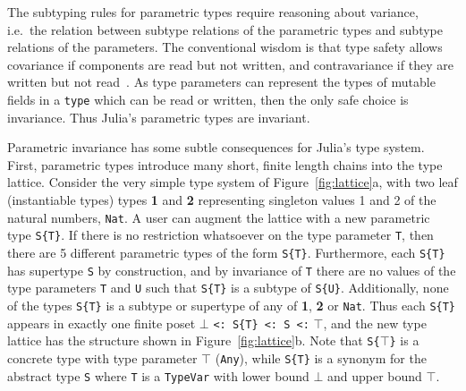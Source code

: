\documentclass[pldi]{sigplanconf-pldi15}
\begin{document}
The subtyping rules for parametric types require reasoning about variance,
i.e.\ the relation between subtype relations of the parametric types and
subtype relations of the parameters. The conventional wisdom is that type
safety allows covariance if components are read but not written, and
contravariance if they are written but not read~\cite{Castagna1995}. As type
parameters can represent the types of mutable fields in a \verb|type| which can
be read or written, then the only safe choice is invariance. Thus Julia's
parametric types are invariant.

Parametric invariance has some subtle consequences for Julia's type system.
First, parametric types introduce many short, finite length chains into the
type lattice. Consider the very simple type system of
Figure~\ref{fig:lattice}a, with two leaf (instantiable types) types \textbf{1}
and \textbf{2} representing singleton values 1 and 2 of the natural numbers,
\verb|Nat|. A user can augment the lattice with a new parametric type
\verb|S{T}|. If there is no restriction whatsoever on the type parameter
\verb|T|, then there are 5 different parametric types of the form \verb|S{T}|.
Furthermore, each \verb|S{T}| has supertype \verb|S| by construction, and by
invariance of \verb|T| there are no values of the type parameters \verb|T| and
\verb|U| such that \verb|S{T}| is a subtype of \verb|S{U}|. Additionally, none
of the types \verb|S{T}| is a subtype or supertype of any of \textbf{1},
\textbf{2} or \verb|Nat|. Thus each \verb|S{T}| appears in exactly one finite
poset $\bot$ \verb|<: S{T} <: S <:| $\top$, and the new type lattice has the
structure shown in Figure~\ref{fig:lattice}b. Note that \verb|S{|$\top$\verb|}|
is a concrete type with type parameter $\top$ (\verb|Any|), while \verb|S{T}|
is a synonym for the abstract type \verb|S| where \verb|T| is a \verb|TypeVar|
with lower bound $\bot$ and upper bound $\top$. 
\end{document}
